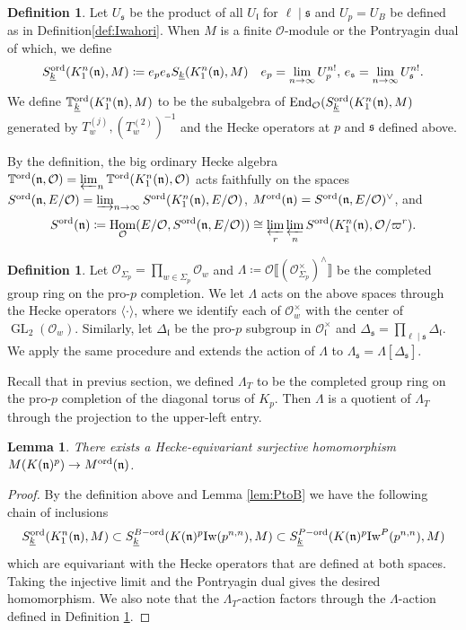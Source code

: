 \documentclass[leqno]{amsart}
\newcommand{\wt}[1]{\underline{ #1 }}
\newcommand{\TT}{\mathbb{T}} %
\newcommand{\Iw}{\textnormal{Iw}}
\newcommand{\ord}{\textnormal{ord}}
\DeclareMathOperator{\GL}{GL}
\newcommand{\oo}{\mathcal{O}} %
\newcommand{\fs}{\mathfrak{s}}
\newcommand{\fn}{\mathfrak{n}}
\newcommand{\fl}{\mathfrak{l}}
\DeclareMathOperator{\End}{End}
\DeclareMathOperator{\Hom}{Hom}
\newtheorem{lem}[thm]{Lemma}
\theoremstyle{definition}
\newtheorem{defn}[thm]{Definition}
\theoremstyle{remark}
\begin{document}
\begin{defn}\label{def:ord_space_auxlevel}
Let $U_\fs$ be the product of all $  U_{\fl}$
for $\ell\mid \fs$ and $U_p=U_B$ be defined 
as in Definition\ref{def:Iwahori}.
When $M$ is a finite  $\oo$-module or the 
Pontryagin dual of which,
we define 
\[
	S_{\wt{k}}^{\ord}(K^n_1(\fn),M)\coloneqq
	e_pe_{\fs} S_{\wt{k}}(K^n_1(\fn),M)\quad
	e_p=\lim_{n\to \infty}U_p^{n!},\,
	e_\fs=\lim_{n\to \infty}U_\fs^{n!}.
\]
We define $\TT^{\ord}_{\wt{k}}(K^n_1(\fn),M)$
to be the subalgebra of 
$\End_{\oo}(S_{\wt{k}}^{\ord}(K^n_1(\fn),M)$
generated by $T_w^{(j)}, (T_{w}^{(2)})^{-1}$
and the Hecke operators at $p$ and  $\fs$ defined above.
\end{defn}
By the definition,
the big ordinary Hecke algebra
$\TT^{\ord}(\fn,\oo)=\varprojlim_n
\TT^{\ord}(K^n_1(\fn),\oo)$
acts faithfully on the spaces
$S^{\ord}(\fn,E/\oo)=\varinjlim_{n\to \infty}
S^{\ord}(K^n_1(\fn),E/\oo)$,
$M^{\ord}(\fn)=S^{\ord}(\fn,E/\oo)^\vee$, and
\begin{equation*}
	S^{\ord}(\fn)\coloneqq
	\Hom_\oo(E/\oo, S^{\ord}(\fn,E/\oo))
	\cong \varprojlim_r\varprojlim_n 
	S^{\ord}(K^n_1(\fn),\oo/\varpi^r).
\end{equation*}

\begin{defn}\label{def:lambda_rings}
Let $\oo_{\Sigma_p}=\prod_{w\in\Sigma_p}\oo_w$
and $\Lambda\coloneqq
\oo\llbracket(\oo_{\Sigma_p}^\times)^\wedge\rrbracket$
be the completed group ring on the pro-$p$ completion.
We let $\Lambda$ acts on the above spaces
through the Hecke operators  $\langle\cdot\rangle$,
where we identify each of  $\oo_w^\times$
with the center of $\GL_2(\oo_w)$.
Similarly, let $\Delta_\fl$ be the 
pro-$p$ subgroup in $\oo_\fl^\times$
and $\Delta_{\fs}=\prod_{\ell\mid \fs}\Delta_{\fl}$.
We apply the same procedure 
and extends the action of $\Lambda$
to $\Lambda_{\fs}=\Lambda[\Delta_{\fs}]$.
\end{defn}

Recall that in previus section,
we defined $\Lambda_T$
to be the completed group ring 
on the pro-$p$ completion of 
the diagonal torus of $K_p$.
Then $\Lambda$ is a quotient of  $\Lambda_T$
through the projection to the upper-left entry.
\begin{lem}\label{lem:coh_to_ord}
	There exists a Hecke-equivariant
	surjective homomorphism 
	$M(K(\fn)^p)\to M^{\ord}(\fn)$. 
\end{lem}
\begin{proof}
By the definition above and Lemma \ref{lem:PtoB}
we have the following chain of 
inclusions
\[
	S_{\wt{k}}^{\ord}(K^n_1(\fn),M)\subset
	S_{\wt{k}}^{B-\ord}(K(\fn)^p\Iw(p^{n,n}),M)\subset
	S_{\wt{k}}^{P-\ord}(K(\fn)^p\Iw^P(p^{n,n}),M)
\]
which are equivariant with the Hecke operators
that are defined at both spaces.
Taking the injective limit and the Pontryagin dual 
gives the desired homomorphism.
We also note that the $\Lambda_T$-action
factors through  the $\Lambda$-action defined in
Definition \ref{def:lambda_rings}.
\end{proof}
\end{document}
